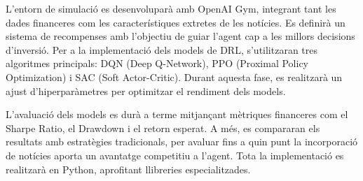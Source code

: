 \documentclass[12pt,a4paper,twoside]{book}
\begin{document}
L'entorn de simulació es desenvoluparà amb OpenAI Gym, integrant tant les dades financeres com les característiques extretes de les notícies. Es definirà un sistema de recompenses amb l'objectiu de guiar l'agent cap a les millors decisions d'inversió. Per a la implementació dels models de DRL, s'utilitzaran tres algoritmes principals: DQN (Deep Q-Network), PPO (Proximal Policy Optimization) i SAC (Soft Actor-Critic). Durant aquesta fase, es realitzarà un ajust d'hiperparàmetres per optimitzar el rendiment dels models.

L'avaluació dels models es durà a terme mitjançant mètriques financeres com el Sharpe Ratio, el Drawdown i el retorn esperat. A més, es compararan els resultats amb estratègies tradicionals, per avaluar fins a quin punt la incorporació de notícies aporta un avantatge competitiu a l'agent. Tota la implementació es realitzarà en Python\cite{Python}, aprofitant llibreries especialitzades.
\end{document}
